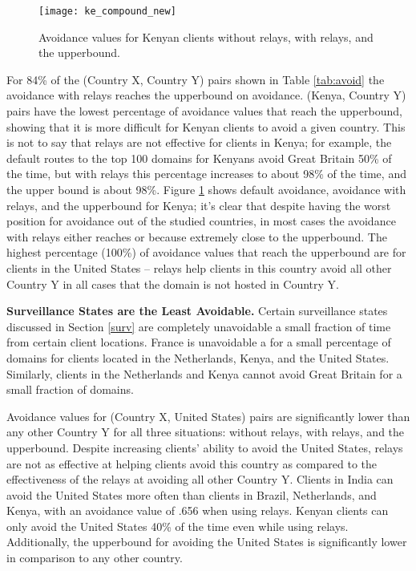 \begin{figure}
\centering
\texttt{[image: ke\_compound\_new]}
\caption{Avoidance values for Kenyan clients without relays, with relays, and the upperbound.}
\label{fig:ke_avoidance}
\end{figure}

For 84\% of the (Country X, Country Y) pairs shown in Table \ref{tab:avoid} the avoidance with relays reaches the upperbound on avoidance.  (Kenya, Country Y) pairs have the lowest percentage of avoidance values that reach the upperbound, showing that it is more difficult for Kenyan clients to avoid a given country.  This is not to say that relays are not effective for clients in Kenya; for example, the default routes to the top 100 domains for Kenyans avoid Great Britain 50\% of the time, but with relays this percentage increases to about 98\% of the time, and the upper bound is about 98\%. Figure \ref{fig:ke_avoidance} shows default avoidance, avoidance with relays, and the upperbound for Kenya; it's clear that despite having the worst position for avoidance out of the studied countries, in most cases the avoidance with relays either reaches or because extremely close to the upperbound.  The highest percentage (100\%) of avoidance values that reach the upperbound are for clients in the United States -- relays help clients in this country avoid all other Country Y in all cases that the domain is not hosted in Country Y.  

{\bf Surveillance States are the Least Avoidable.}
Certain surveillance states discussed in Section \ref{surv} are completely unavoidable a small fraction of time from certain client locations.  France is unavoidable a for a small percentage of domains for clients located in the Netherlands, Kenya, and the United States.  Similarly, clients in the Netherlands and Kenya cannot avoid Great Britain for a small fraction of domains.  

Avoidance values for (Country X, United States) pairs are significantly lower than any other Country Y for all three situations: without relays, with relays, and the upperbound.   Despite increasing clients' ability to avoid the United States, relays are not as effective at helping clients avoid this country as compared to the effectiveness of the relays at avoiding all other Country Y.  Clients in India can avoid the United States more often than clients in Brazil, Netherlands, and Kenya, with an avoidance value of .656 when using relays.  Kenyan clients can only avoid the United States 40\% of the time even while using relays.  Additionally, the upperbound for avoiding the United States is significantly lower in comparison to any other country.  


